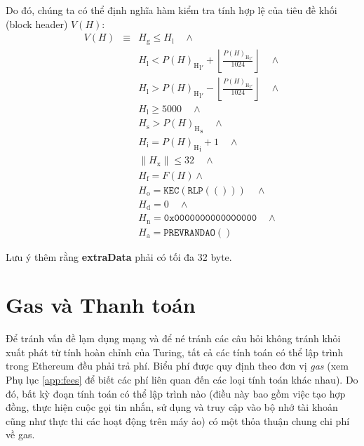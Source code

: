 \documentclass[9pt,oneside]{amsart}
\begin{document}
\begin{multicols}{2}
\hypertarget{block_header_validity_function}{}Do đó, chúng ta có thể định nghĩa hàm kiểm tra tính hợp lệ của tiêu đề khối (block header) $V(H)$:
\begin{eqnarray}
V(H) & \equiv & H_{\mathrm{g}} \le H_{\mathrm{l}}  \quad \wedge \\
\nonumber& & H_{\mathrm{l}} < {P(H)_{\mathrm{H}}}_{\mathrm{l}'} + \left\lfloor\frac{{P(H)_{\mathrm{H}}}_{\mathrm{l}'}}{1024}\right\rfloor  \quad \wedge \\
\nonumber& & H_{\mathrm{l}} > {P(H)_{\mathrm{H}}}_{\mathrm{l}'} - \left\lfloor\frac{{P(H)_{\mathrm{H}}}_{\mathrm{l}'}}{1024}\right\rfloor  \quad \wedge \\
\nonumber& & H_{\mathrm{l}} \geqslant 5000  \quad \wedge \\
\nonumber& & H_{\mathrm{s}} > {P(H)_{\mathrm{H}}}_{\mathrm{s}} \quad \wedge \\
\nonumber& & H_{\mathrm{i}} = {P(H)_{\mathrm{H}}}_{\mathrm{i}} +1 \quad \wedge \\
\nonumber& & \lVert H_{\mathrm{x}} \rVert \le 32 \quad \wedge \\
\nonumber& & H_{\mathrm{f}} = F(H) \wedge \\
\nonumber& & H_{\mathrm{o}} = \texttt{KEC}(\texttt{RLP}(())) \quad \wedge \\
\nonumber& & H_{\mathrm{d}} = 0 \quad \wedge \\
\nonumber& & H_{\mathrm{n}} = \texttt{0x0000000000000000} \quad \wedge \\
\nonumber& & H_{\mathrm{a}} = \mathtt{PREVRANDAO}()
\end{eqnarray}

Lưu ý thêm rằng \textbf{extraData} phải có tối đa 32 byte.

\section{Gas và Thanh toán} \label{ch:payment}

Để tránh vấn đề lạm dụng mạng và để né tránh các câu hỏi không tránh khỏi xuất phát từ tính hoàn chỉnh của Turing, tất cả các tính toán có thể lập trình trong Ethereum đều phải trả phí. Biểu phí được quy định theo đơn vị \textit{gas} (xem Phụ lục \ref{app:fees} để biết các phí liên quan đến các loại tính toán khác nhau). Do đó, bất kỳ đoạn tính toán có thể lập trình nào (điều này bao gồm việc tạo hợp đồng, thực hiện cuộc gọi tin nhắn, sử dụng và truy cập vào bộ nhớ tài khoản cũng như thực thi các hoạt động trên máy ảo) có một thỏa thuận chung chi phí về gas.


\end{multicols}
\end{document}
